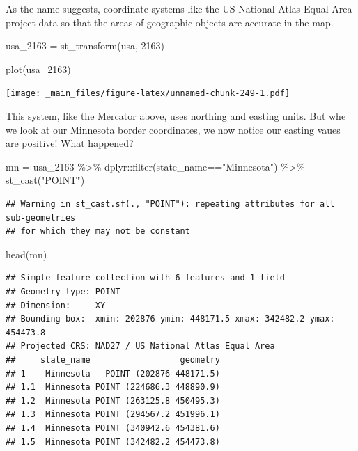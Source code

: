 \documentclass[
]{book}
\newenvironment{Shaded}{\begin{snugshade}}{\end{snugshade}}
\newcommand{\DecValTok}[1]{\textcolor[rgb]{0.00,0.00,0.81}{#1}}
\newcommand{\FunctionTok}[1]{\textcolor[rgb]{0.00,0.00,0.00}{#1}}
\newcommand{\NormalTok}[1]{#1}
\newcommand{\OtherTok}[1]{\textcolor[rgb]{0.56,0.35,0.01}{#1}}
\newcommand{\SpecialCharTok}[1]{\textcolor[rgb]{0.00,0.00,0.00}{#1}}
\newcommand{\StringTok}[1]{\textcolor[rgb]{0.31,0.60,0.02}{#1}}
\begin{document}
As the name suggests, coordinate systems like the US National Atlas Equal Area project data so that the areas of geographic objects are accurate in the map.

\begin{Shaded}
\begin{Highlighting}[]
\NormalTok{usa\_2163 }\OtherTok{=} \FunctionTok{st\_transform}\NormalTok{(usa, }\DecValTok{2163}\NormalTok{)}

\FunctionTok{plot}\NormalTok{(usa\_2163)}
\end{Highlighting}
\end{Shaded}

\texttt{[image: \_main\_files/figure-latex/unnamed-chunk-249-1.pdf]}

This system, like the Mercator above, uses northing and easting units. But whe we look at our Minnesota border coordinates, we now notice our easting vaues are positive! What happened?

\begin{Shaded}
\begin{Highlighting}[]
\NormalTok{mn }\OtherTok{=}\NormalTok{ usa\_2163 }\SpecialCharTok{\%\textgreater{}\%}
\NormalTok{  dplyr}\SpecialCharTok{::}\FunctionTok{filter}\NormalTok{(state\_name}\SpecialCharTok{==}\StringTok{"Minnesota"}\NormalTok{) }\SpecialCharTok{\%\textgreater{}\%}
  \FunctionTok{st\_cast}\NormalTok{(}\StringTok{"POINT"}\NormalTok{)}
\end{Highlighting}
\end{Shaded}

\begin{verbatim}
## Warning in st_cast.sf(., "POINT"): repeating attributes for all sub-geometries
## for which they may not be constant
\end{verbatim}

\begin{Shaded}
\begin{Highlighting}[]
\FunctionTok{head}\NormalTok{(mn)}
\end{Highlighting}
\end{Shaded}

\begin{verbatim}
## Simple feature collection with 6 features and 1 field
## Geometry type: POINT
## Dimension:     XY
## Bounding box:  xmin: 202876 ymin: 448171.5 xmax: 342482.2 ymax: 454473.8
## Projected CRS: NAD27 / US National Atlas Equal Area
##     state_name                  geometry
## 1    Minnesota   POINT (202876 448171.5)
## 1.1  Minnesota POINT (224686.3 448890.9)
## 1.2  Minnesota POINT (263125.8 450495.3)
## 1.3  Minnesota POINT (294567.2 451996.1)
## 1.4  Minnesota POINT (340942.6 454381.6)
## 1.5  Minnesota POINT (342482.2 454473.8)
\end{verbatim}
\end{document}
